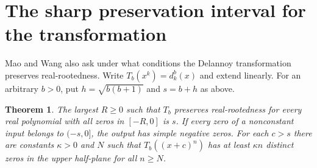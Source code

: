 \documentclass[11pt]{article}
\newtheorem{theorem}{Theorem}
\begin{document}
\section*{The sharp preservation interval for the transformation}
Mao and Wang also ask under what conditions the Delannoy transformation preserves real-rootedness. Write $T_b(x^k)=d_k^b(x)$ and extend linearly. For an arbitrary $b>0$, put $h=\sqrt{b(b+1)}$ and $s=b+h$ as above.
\begin{theorem}\label{th:transform}
The largest $R\ge0$ such that $T_b$ preserves real-rootedness for every real polynomial with all zeros in $[-R,0]$ is $s$. If every zero of a nonconstant input belongs to $(-s,0]$, the output has simple negative zeros. For each $c>s$ there are constants $\kappa>0$ and $N$ such that $T_b((x+c)^n)$ has at least $\kappa n$ distinct zeros in the upper half-plane for all $n\ge N$.
\end{theorem}
\end{document}
